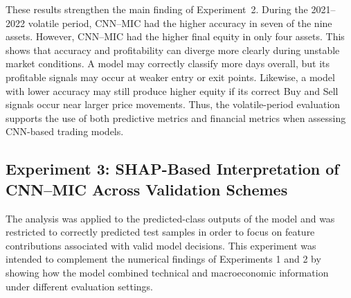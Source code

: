 \begin{table}[H]
	\centering
	\caption{Volatile-period performance of CNN--TIC and CNN--MIC using 2021--2022 as evaluation window}
	\label{tab:volatile-period-performance}
	\end{table}

These results strengthen the main finding of Experiment~2. During the 2021--2022 volatile period, CNN--MIC had the higher accuracy in seven of the nine assets. However, CNN--MIC had the higher final equity in only four assets. This shows that accuracy and profitability can diverge more clearly during unstable market conditions. A model may correctly classify more days overall, but its profitable signals may occur at weaker entry or exit points. 
Likewise, a model with lower accuracy may still produce higher equity if its correct Buy and Sell signals occur near larger price movements. Thus, the volatile-period evaluation supports the use of both predictive metrics and financial metrics when assessing CNN-based trading models.

\subsection{Experiment 3: SHAP-Based Interpretation of CNN--MIC Across Validation Schemes}

 The analysis was applied to the predicted-class outputs of the model and was restricted to correctly predicted test samples in order to focus on feature contributions associated with valid model decisions. This experiment was intended to complement the numerical findings of Experiments 1 and 2 by showing how the model combined technical and macroeconomic information under different evaluation settings.

